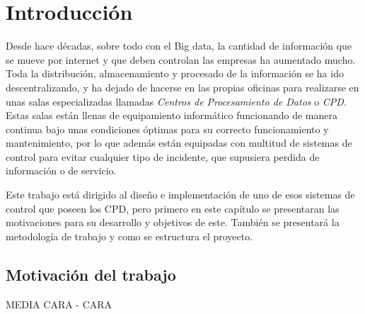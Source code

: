 \newpage %
\thispagestyle{empty}
\mbox{}

\chapter{Introducción} 
\label{ch:introduccion}
Desde hace décadas, sobre todo con el Big data, la cantidad de información que se mueve por internet y que deben controlan las empresas ha aumentado mucho. \\ Toda la distribución, almacenamiento y procesado de la información se ha ido descentralizando, y ha dejado de hacerse en las propias oficinas para realizarse en unas salas especializadas llamadas \textit{Centros de Procesamiento de Datos} o \textit{CPD}. \\ Estas salas están llenas de equipamiento informático funcionando de manera continua bajo unas condiciones óptimas para su correcto funcionamiento y mantenimiento, por lo que además están equipadas con multitud de sistemas de control para evitar cualquier tipo de incidente, que supusiera perdida de información o de servicio.

Este trabajo está dirigido al diseño e implementación de uno de esos sistemas de control que poseen los CPD, pero primero en este capítulo se presentaran las motivaciones para su desarrollo y objetivos de este. También se presentará la metodología de trabajo y como se estructura el proyecto.

\section{Motivación del trabajo}
MEDIA CARA - CARA

